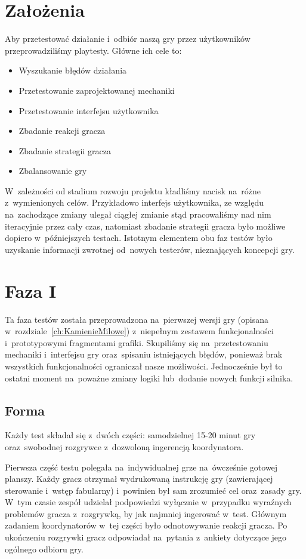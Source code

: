 \documentclass[licencjacka]{pracamgr}
\begin{document}
  \section{Założenia}
    Aby przetestować działanie i~odbiór naszą gry przez użytkowników przeprowadziliśmy playtesty. Główne ich cele to:
    \begin{itemize}
    \item Wyszukanie błędów działania
    \item Przetestowanie zaprojektowanej mechaniki
    \item Przetestowanie interfejsu użytkownika
    \item Zbadanie reakcji gracza
    \item Zbadanie strategii gracza
    \item Zbalansowanie gry
    \end{itemize}
    W~zależności od stadium rozwoju projektu kładliśmy nacisk na~różne z~wymienionych celów. Przykładowo interfejs użytkownika,
    ze względu na~zachodzące zmiany ulegał ciągłej zmianie stąd pracowaliśmy nad nim iteracyjnie przez cały czas, natomiast
    zbadanie strategii gracza było możliwe dopiero w~późniejszych testach. Istotnym elementem obu faz testów było uzyskanie
    informacji zwrotnej od~nowych testerów, nieznających koncepcji gry.

  \section{Faza I}
    Ta faza testów została przeprowadzona na~pierwszej wersji gry (opisana w~rozdziale~\ref{ch:KamienieMilowe})
    z~niepełnym zestawem funkcjonalności i~prototypowymi fragmentami grafiki. Skupiliśmy się na~przetestowaniu mechaniki
    i~interfejsu gry oraz~spisaniu istniejących błędów, ponieważ brak wszystkich funkcjonalności ograniczał nasze możliwości.
    Jednocześnie był to ostatni moment na~poważne zmiany logiki lub~dodanie nowych funkcji silnika.

    \subsection{Forma}
      Każdy test składał  się z~dwóch części: samodzielnej 15-20 minut gry
      oraz~swobodnej rozgrywce z~dozwoloną ingerencją koordynatora.

      Pierwsza część testu polegała na~indywidualnej grze na~ówcześnie gotowej planszy.
      Każdy gracz otrzymał wydrukowaną instrukcję gry (zawierającej sterowanie i~wstęp fabularny)
      i~powinien był sam zrozumieć cel oraz~zasady gry. W~tym czasie zespół udzielał podpowiedzi
      wyłącznie w~przypadku wyraźnych problemów gracza z~rozgrywką, by jak najmniej ingerować w~test.
      Głównym zadaniem koordynatorów w~tej części było odnotowywanie reakcji gracza.
      Po ukończeniu rozgrywki gracz odpowiadał na~pytania z~ankiety dotyczące jego ogólnego odbioru gry.
\end{document}
